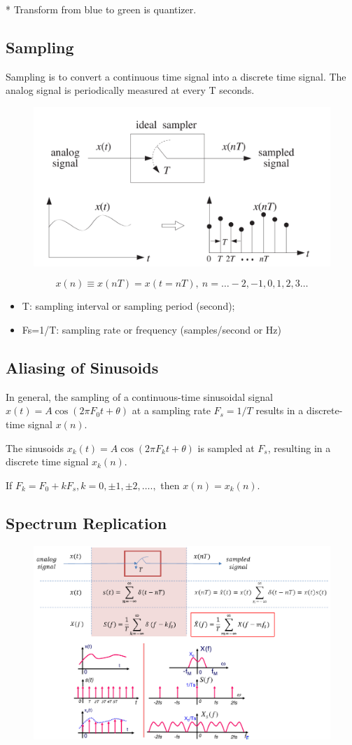 * Transform from blue to green is quantizer.
\subsection{Sampling}
Sampling is to convert a continuous time signal into a discrete time signal. The analog signal is periodically measured at every T seconds.
\begin{figure}[h!]
    \centering
    \includegraphics[width=0.5\linewidth]{img/3.png}
\end{figure}
\begin{equation*}
    x(n) \equiv x(nT)=x(t=nT),\ n=…-2, -1, 0, 1, 2, 3…
\end{equation*}
\begin{itemize}
    \item T: sampling interval or sampling period (second);
    \item Fs=1/T: sampling rate or frequency (samples/second or Hz)
\end{itemize}
\subsection{Aliasing of Sinusoids}
In general, the sampling of a continuous-time sinusoidal signal $x(t) = A\cos(2\pi F_0 t + \theta)$ at a sampling rate $ F_s=1/T $ results in a discrete-time signal $x(n)$.

The sinusoids $x_k(t) = A\cos(2\pi F_k t + \theta)$ is sampled at $F_s$, resulting  in a discrete time signal $x_k(n)$.

If $F_k=F_0+kF_s, k=0, \pm 1, \pm 2, ….,$ then $x(n)=x_k(n)$.
\subsection{Spectrum Replication}
\begin{figure}[h!]
    \centering
    \includegraphics[width=0.7\linewidth]{img/5.png}
\end{figure}

